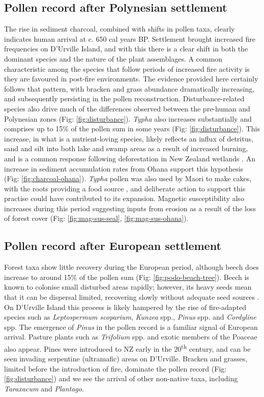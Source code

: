 \documentclass{article}
\begin{document}
\subsection{Pollen record after Polynesian settlement}

The rise in sediment charcoal, combined with shifts in pollen taxa, clearly indicates human arrival at c. 650 cal years BP. Settlement brought increased fire frequencies on D'Urville Island, and with this there is a clear shift in both the dominant species and the nature of the plant assemblages.  A common characteristic among the species that follow periods of increased fire activity is they are favoured in post-fire environments.  The evidence provided here certainly follows that pattern, with bracken and grass abundance dramatically increasing, and subsequently persisting in the pollen reconstruction.  Disturbance-related species also drive much of the differences observed between the pre-human and Polynesian zones (Fig: \ref*{fig:disturbance}). \textit{Typha} also increases substantially and comprises up to 15\% of the pollen sum in some years (Fig: \ref{fig:disturbance}).  This increase, in what is a nutrient-loving species, likely reflects an influx of detritus, sand and silt into both lake and swamp areas as a result of increased burning, and is a common response following deforestation in New Zealand wetlands \citep{McGlone1999}.  An increase in sediment accumulation rates from Ohana support this hypothesis (Fig: \ref{fig:charcoal-ohana}). \textit{Typha} pollen was also used by Maori to make cakes, with the roots providing a food source \citep{taylor2010te}, and deliberate action to support this practise could have contributed to its expansion.  Magnetic susceptibility also increases during this period suggesting inputs from erosion as a result of the loss of forest cover (Fig: \ref{fig:mag-sus-seal}, \ref{fig:mag-sus-ohana}).    
	
\subsection{Pollen record after European settlement}

Forest taxa show little  recovery during the European period, although beech does increase to around 15\% of the pollen sum (Fig: \ref{fig:podo-beach-tree}).  Beech is known to colonise small disturbed areas rapidly; however, its heavy seeds mean that it can be dispersal limited, recovering slowly without adequate seed sources \citep{Wardle1984}. On D'Urville Island this process is likely hampered by the rise of fire-adapted species such as \textit{Leptospermum scoparium}, \textit{Kunzea} spp., \textit{Pinus} spp. and \textit{Cordyline} spp.  The emergence of \textit{Pinus} in the pollen record is a familiar signal of European arrival. Pasture plants such as \textit{Trifolium} spp. and exotic members of the Poaceae also appear. Pines were introduced to NZ early in the 20\textsuperscript{th} century, and can be seen invading serpentine (ultramafic) areas on D'Urville. Bracken and grasses, limited before the introduction of fire, dominate the pollen record (Fig: \ref{fig:disturbance}) and we see the arrival of other non-native taxa, including \textit{Taraxacum} and \textit{Plantago}. 
\end{document}
